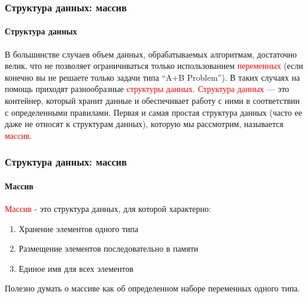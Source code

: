 \documentclass[aspectratio=169]{beamer}
\begin{document}
\begin{frame}
\frametitle{Структура данных: массив}
\framesubtitle{Структура данных}
\justifying

В большинстве случаев объем данных, обрабатываемых алгоритмам, достаточно велик, что не позволяет ограничиваться только использованием \textcolor{red}{переменных} (если конечно вы не решаете только задачи типа “A+B Problem”).\newline\newline
В таких случаях на помощь приходят разнообразные \textcolor{red}{структуры данных}.\newline\newline
\textcolor{red}{Структура данных} — это контейнер, который хранит данные и обеспечивает работу с ними в соответствии с определенными правилами.\newline\newline
Первая и самая простая структура данных (часто ее даже не относят к структурам данных), которую мы рассмотрим, называется \textcolor{red}{массив}.\newline\newline


\end{frame}

\begin{frame}
\frametitle{Структура данных: массив}
\framesubtitle{Массив}
\justifying
\textcolor{red}{Массив} - это структура данных, для которой характерно:
\begin{enumerate}
  \item{Хранение элементов одного типа}
  \item{Размещение элементов последовательно в памяти}
  \item{Единое имя для всех элементов\newline}
\end{enumerate}
Полезно думать о массиве как об определенном наборе переменных одного типа.
\begin{figure}
    \captionsetup[subfigure]{labelformat=empty}
    \centering
\end{figure}
\end{frame}
\end{document}
